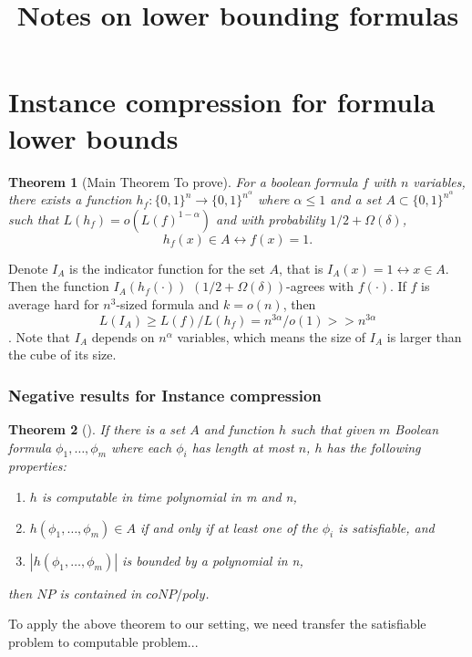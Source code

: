 \documentclass[12pt]{article}
\title{Notes on lower bounding formulas}
\newtheorem{theorem}{Theorem}[section]
\renewcommand{\.}{,\ldots,}
\begin{document}
		\maketitle 
		
\newcommand{\F}{\mathcal{F}}		
\newcommand{\E}{\mathbb{E}}		
\renewcommand{\a}{\alpha}		

\section{Instance compression for formula lower bounds}

\begin{theorem}[Main Theorem To prove]
For a boolean formula $f$ with $n$ variables, there exists a function $h_f:\{0,1\}^n\rightarrow \{0,1\}^{n^\a}$ where $\a \leq 1$  and a set $A\subset \{0,1\}^{n^\a}$ such that $L(h_f)=o(L(f)^{1-\a})$ and with probability $1/2+\Omega(\delta)$, $$h_f(x)\in A \leftrightarrow f(x)=1.$$
\end{theorem}
Denote $I_A$ is the indicator function for the set $A$, that is $I_A(x)=1\leftrightarrow x\in A$. Then the function $I_A(h_f(\cdot))$ $(1/2+\Omega(\delta))$-agrees with $f(\cdot)$. If $f$ is average hard for $n^3$-sized formula and $k=o(n)$, then $$L(I_A)\geq L(f)/L(h_f)=n^{3\alpha}/o(1)>>n^{3\a}$$. Note that $I_A$ depends on $n^{\a}$ variables, which means the size of $I_A$ is larger than the cube of its size. 


\subsubsection{Negative results for Instance compression}
\begin{theorem}[\cite{fortnow2008infeasibility}]
If there is a set $A$ and function $h$ such
that given $m$ Boolean formula $\phi_1, \ldots, \phi_m$ where each $\phi_i$ has length at most $n$, $h$ has the following
properties:
\begin{enumerate}
\item  $h$ is computable in time polynomial in m and n,
\item  $h(\phi_1, \ldots, \phi_m) \in A$ if and only if at least one of the $\phi_i$ is satisfiable, and
\item  $|h(\phi_1, \ldots, \phi_m)|$ is bounded by a polynomial in n,
\end{enumerate}
then  $NP$ is contained in $coNP/poly$.
\end{theorem}

To apply the above theorem to our setting, we need transfer the satisfiable problem to computable problem... 
\end{document}
